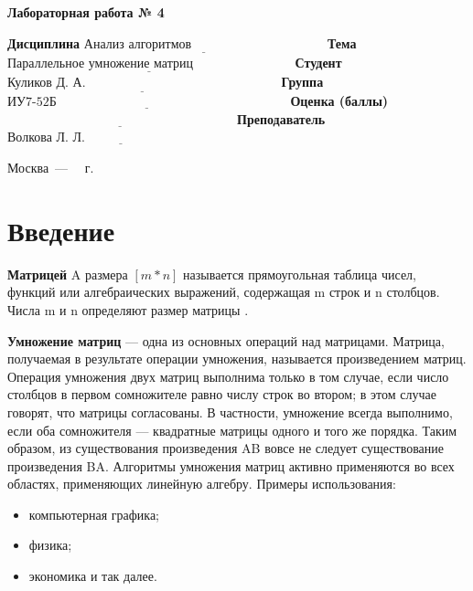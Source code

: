 \documentclass[12pt]{report}
\begin{document}
\begin{center}
\Large\textbf{Лабораторная работа № 4}
\end{center}
\vspace{\baselineskip}
\noindent\textbf{Дисциплина} $\underline{\text{Анализ алгоритмов~~~~~~~~~~~~~~~~~~~~~~~~~~~~~~~}}$\newline\newline
\noindent\textbf{Тема} $\underline{\text{Параллельное умножение матриц~~~~~~~~~~~~~~~~~~~~~~~}}$\newline\newline
\noindent\textbf{Студент} $\underline{\text{Куликов Д. А.~~~~~~~~~~~~~~~~~~~~~~~~~~~~~~~~~~~~~~~~~~~~~}}$\newline\newline
\noindent\textbf{Группа} $\underline{\text{ИУ7-52Б~~~~~~~~~~~~~~~~~~~~~~~~~~~~~~~~~~~~~~~~~~~~~~~~~~~~~~}}$\newline\newline
\noindent\textbf{Оценка (баллы)} $\underline{\text{~~~~~~~~~~~~~~~~~~~~~~~~~~~~~~~~~~~~~~~~~~~~~~~~~~~~~}}$\newline\newline
\noindent\textbf{Преподаватель} $\underline{\text{Волкова Л. Л.~~~~~~~~~~~~~~~~~~~~~~~~~~~~~~~~~~~}}$\newline

\begin{center}
	\vfill
	Москва~---~\the\year
	~г.
\end{center}
\clearpage

\tableofcontents

\newpage
\chapter*{Введение}
\textbf{Матрицей} A размера $[m*n]$ называется прямоугольная таблица
чисел, функций или алгебраических выражений, содержащая m строк и n столбцов. Числа m и n определяют размер матрицы \cite{mtrbook}. 

\textbf{Умножение матриц} — одна из основных операций над матрицами.
Матрица, получаемая в результате операции умножения, называется
произведением матриц. Операция умножения двух матриц выполнима только в
том случае, если число столбцов в первом сомножителе равно числу строк во
втором; в этом случае говорят, что матрицы согласованы. В частности,
умножение всегда выполнимо, если оба сомножителя — квадратные матрицы
одного и того же порядка. Таким образом, из существования произведения AB
вовсе не следует существование произведения BA.
Алгоритмы умножения матриц активно применяются во всех областях, применяющих
линейную алгебру. Примеры использования:
\begin{itemize}
	\item компьютерная графика;
	\item физика;
	\item экономика и так далее.
\end{itemize}
\vspace{\baselineskip}
\end{document}

